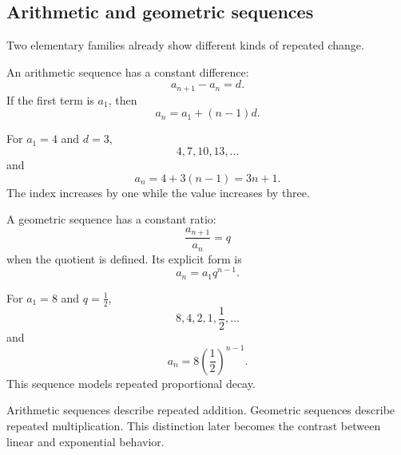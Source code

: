 \subsection{Arithmetic and geometric sequences}

Two elementary families already show different kinds of repeated change.

\begin{definitionbox}
An arithmetic sequence has a constant difference:
\[
a_{n+1}-a_n=d.
\]
If the first term is \(a_1\), then
\[
a_n=a_1+(n-1)d.
\]
\end{definitionbox}

\begin{examplebox}
For \(a_1=4\) and \(d=3\),
\[
4,7,10,13,\ldots
\]
and
\[
a_n=4+3(n-1)=3n+1.
\]
The index increases by one while the value increases by three.
\end{examplebox}

\begin{definitionbox}
A geometric sequence has a constant ratio:
\[
\frac{a_{n+1}}{a_n}=q
\]
when the quotient is defined. Its explicit form is
\[
a_n=a_1q^{n-1}.
\]
\end{definitionbox}

\begin{examplebox}
For \(a_1=8\) and \(q=\tfrac12\),
\[
8,4,2,1,\frac12,\ldots
\]
and
\[
a_n=8\left(\frac12\right)^{n-1}.
\]
This sequence models repeated proportional decay.
\end{examplebox}

\begin{interpretationbox}
Arithmetic sequences describe repeated addition. Geometric sequences describe repeated multiplication. This distinction later becomes the contrast between linear and exponential behavior.
\end{interpretationbox}
